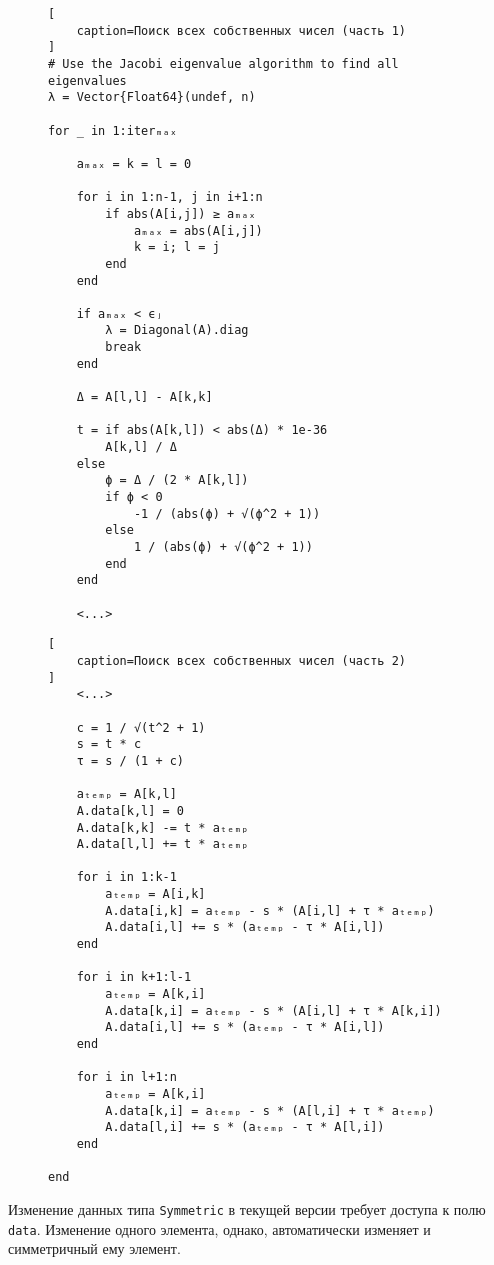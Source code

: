 \begin{figure}[H]
\begin{lstlisting}[
    caption=Поиск всех собственных чисел (часть 1)
]
# Use the Jacobi eigenvalue algorithm to find all eigenvalues
λ = Vector{Float64}(undef, n)

for _ in 1:iterₘₐₓ

    aₘₐₓ = k = l = 0

    for i in 1:n-1, j in i+1:n
        if abs(A[i,j]) ≥ aₘₐₓ
            aₘₐₓ = abs(A[i,j])
            k = i; l = j
        end
    end

    if aₘₐₓ < ϵⱼ
        λ = Diagonal(A).diag
        break
    end

    Δ = A[l,l] - A[k,k]

    t = if abs(A[k,l]) < abs(Δ) * 1e-36
        A[k,l] / Δ
    else
        ϕ = Δ / (2 * A[k,l])
        if ϕ < 0
            -1 / (abs(ϕ) + √(ϕ^2 + 1))
        else
            1 / (abs(ϕ) + √(ϕ^2 + 1))
        end
    end

    <...>

\end{lstlisting}
\end{figure}

\begin{figure}[H]
\begin{lstlisting}[
    caption=Поиск всех собственных чисел (часть 2)
]
    <...>

    c = 1 / √(t^2 + 1)
    s = t * c
    τ = s / (1 + c)

    aₜₑₘₚ = A[k,l]
    A.data[k,l] = 0
    A.data[k,k] -= t * aₜₑₘₚ
    A.data[l,l] += t * aₜₑₘₚ

    for i in 1:k-1
        aₜₑₘₚ = A[i,k]
        A.data[i,k] = aₜₑₘₚ - s * (A[i,l] + τ * aₜₑₘₚ)
        A.data[i,l] += s * (aₜₑₘₚ - τ * A[i,l])
    end

    for i in k+1:l-1
        aₜₑₘₚ = A[k,i]
        A.data[k,i] = aₜₑₘₚ - s * (A[i,l] + τ * A[k,i])
        A.data[i,l] += s * (aₜₑₘₚ - τ * A[i,l])
    end

    for i in l+1:n
        aₜₑₘₚ = A[k,i]
        A.data[k,i] = aₜₑₘₚ - s * (A[l,i] + τ * aₜₑₘₚ)
        A.data[l,i] += s * (aₜₑₘₚ - τ * A[l,i])
    end

end
\end{lstlisting}
\end{figure}

Изменение данных типа {\footnotesize \texttt{Symmetric}} в текущей версии требует доступа к полю {\footnotesize \texttt{data}}. Изменение одного элемента, однако, автоматически изменяет и симметричный ему элемент.

